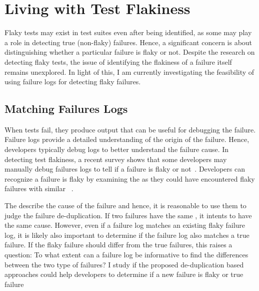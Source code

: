 \section{Living with Test Flakiness}
\label{sec:livingTestFlakiness}

Flaky tests may exist in test suites even after being identified, as some may play a role in detecting true (non-flaky) failures. Hence, a significant concern is about distinguishing whether a particular failure is flaky or not. Despite the research on detecting flaky tests, the issue of identifying the flakiness of a failure itself remains unexplored. In light of this, I am currently investigating the feasibility of using failure logs for detecting flaky failures.




\subsection{Matching Failures Logs}
\label{sec:approaches}

When tests fail, they produce output that can be useful for debugging the failure.
Failure logs provide a detailed understanding of the origin of the failure. Hence, developers typically debug logs to better understand the failure cause. 
In detecting test flakiness, a recent survey shows that some developers may manually debug failures logs to tell if a failure is flaky or not~\cite{habchi2022qualitative}. 
Developers can recognize a failure is flaky by examining the \failure as they could have encountered flaky failures with similar \failure~\cite{gradlePreventingFlaky}.

The \failure describe the cause of the failure and hence, it is reasonable to use them to judge the failure de-duplication.
If two failures have the same \failures, it intents to have the same cause.
However, even if a failure log matches an existing flaky failure log, it is likely also important to determine if the failure log also matches a true failure.
If the flaky failure should differ from the true failures, this raises a question: To what extent can a failure log be informative to find the differences between the two type of failures? I study if the proposed de-duplication based approaches could help developers to determine if a new failure is flaky or true failure


